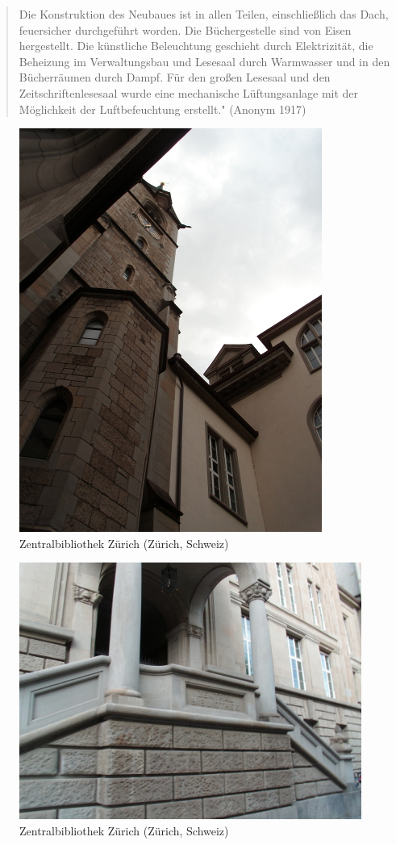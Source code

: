 \documentclass[a4paper,
fontsize=11pt,
oneside,
numbers=noperiodatend,
parskip=half-,
bibliography=totoc,
final
]{scrartcl}
\begin{document}
\begin{quote}
Die Konstruktion des Neubaues ist in allen Teilen, einschließlich das
Dach, feuersicher durchgeführt worden. Die Büchergestelle sind von Eisen
hergestellt. Die künstliche Beleuchtung geschieht durch Elektrizität,
die Beheizung im Verwaltungsbau und Lesesaal durch Warmwasser und in den
Bücherräumen durch Dampf. Für den großen Lesesaal und den
Zeitschriftenlesesaal wurde eine mechanische Lüftungsanlage mit der
Möglichkeit der Luftbefeuchtung erstellt." (Anonym 1917)
\end{quote}

\begin{figure}[htbp]
\centering
\includegraphics{./img/019.jpg}
\caption{Zentralbibliothek Zürich (Zürich,
Schweiz)}
\end{figure}

\begin{figure}[htbp]
\centering
\includegraphics{./img/020.jpg}
\caption{Zentralbibliothek Zürich (Zürich,
Schweiz)}
\end{figure}
\end{document}
